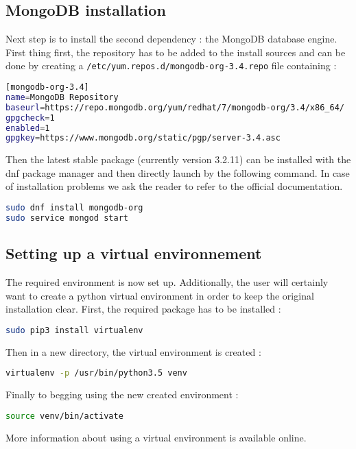 \subsection{MongoDB installation}

Next step is to install the second dependency : the MongoDB database engine. First thing first, the repository has to be added to the install sources and can be done by creating a \texttt{/etc/yum.repos.d/mongodb-org-3.4.repo} file containing :
\smallskip
\begin{lstlisting}[language=bash]
[mongodb-org-3.4]
name=MongoDB Repository
baseurl=https://repo.mongodb.org/yum/redhat/7/mongodb-org/3.4/x86_64/
gpgcheck=1
enabled=1
gpgkey=https://www.mongodb.org/static/pgp/server-3.4.asc
\end{lstlisting}

Then the latest stable package (currently version 3.2.11) can be installed with the dnf package manager and then directly launch by the following command. In case of installation problems we ask the reader to refer to the official documentation.
\smallskip
\begin{lstlisting}[language=bash]
sudo dnf install mongodb-org
sudo service mongod start
\end{lstlisting}

\subsection{Setting up a virtual environnement}

The required environment is now set up. Additionally, the user will certainly want to create a python virtual environment in order to keep the original installation clear. First, the required package has to be installed :
\smallskip
\begin{lstlisting}[language=bash]
sudo pip3 install virtualenv
\end{lstlisting}

Then in a new directory, the virtual environment is created :
\smallskip
\begin{lstlisting}[language=bash]
virtualenv -p /usr/bin/python3.5 venv
\end{lstlisting}

Finally to begging using the new created environment :
\smallskip
\begin{lstlisting}[language=bash]
source venv/bin/activate
\end{lstlisting}

More information about using a virtual environment is available online. \citep{venv}

